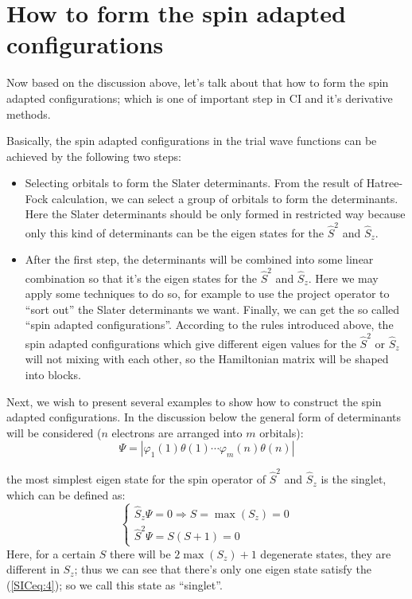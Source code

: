 \section{How to form the spin adapted configurations}
%
%
%
%
Now based on the discussion above, let's talk about that how to form
the spin adapted configurations; which is one of important step in
CI and it's derivative methods.

Basically, the spin adapted configurations in the trial wave
functions can be achieved by the following two steps:
\begin{itemize}
  \item Selecting orbitals to form the Slater determinants.
  From the result of Hatree-Fock calculation, we can select
  a group of orbitals to form the determinants. Here the
  Slater determinants should be only formed in restricted way
  because only this kind of determinants can be the eigen states for
  the $\hat{S}^{2}$ and $\hat{S}_{z}$.
\item After the first step, the determinants will be combined into
  some linear combination so that it's the eigen states for the
  $\hat{S}^{2}$ and $\hat{S}_{z}$. Here we may apply some techniques to
  do so, for example to use the project operator to ``sort out'' the
  Slater determinants we want. Finally, we can get the so called
  ``spin adapted configurations''. According to the rules introduced
  above, the spin adapted configurations which give different eigen
  values for the $\hat{S}^{2}$ or $\hat{S}_{z}$ will not mixing with
  each other, so the Hamiltonian matrix will be shaped into blocks.
\end{itemize}

Next, we wish to present several examples to show how to construct
the spin adapted configurations. In the discussion below the general
form of determinants will be considered ($n$ electrons are arranged
into $m$ orbitals):
\begin{equation}\label{}
\Psi = |\varphi_{1}(1)\theta(1)\cdots\varphi_{m}(n)\theta(n)|
\end{equation}

the most simplest eigen state for the spin operator of $\hat{S}^{2}$
and $\hat{S}_{z}$ is the singlet, which can be defined as:
\begin{equation}\label{SICeq:4}
\left\{
  \begin{array}{ll}
    \hat{S}_{z}\Psi = 0 \Rightarrow S = \max(S_{z}) = 0\\
    \hat{S}^{2}\Psi = S(S+1) = 0
  \end{array}
\right.
\end{equation}
Here, for a certain $S$ there will be $2\max(S_{z}) + 1$ degenerate
states, they are different in $S_{z}$; thus we can see that there's
only one eigen state satisfy the (\ref{SICeq:4}); so we call this
state as ``singlet''.

